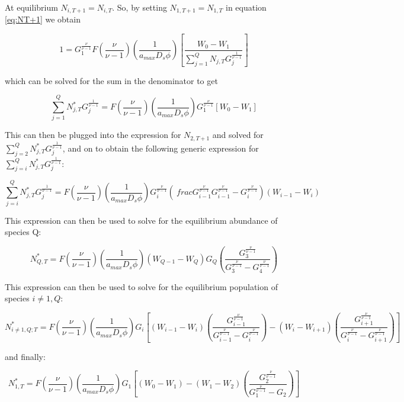 \documentclass{article}
\begin{document}
  At equilibrium $N_{i, T+1} = N_{i, T}$. So, by setting $N_{1, T+1} = N_{1, T}$
  in equation \ref{eq:NT+1} we obtain

  $$ 1 = G_{1}^{\frac{\nu}{\nu-1}}F(\frac{\nu}{\nu - 1})(\frac{1}{a_{max}D_{s}\phi})\left[ \frac{W_{0} - W_{1}}{\sum_{j = 1}^{Q}N_{j,T}G_{j}^{\frac{1}{\nu-1}}} \right] $$


  which can be solved for the sum in the denominator to get

  $$ \sum_{j = 1}^{Q}N_{j,T}^{*}G_{j}^{\frac{1}{\nu-1}} = F(\frac{\nu}{\nu - 1})(\frac{1}{a_{max}D_{s}\phi})G_{1}^{\frac{\nu}{\nu - 1}}[W_{0} - W_{1}]$$

  This can then be plugged into the expression for $N_{2, T+1}$ and
  solved for $\sum_{j = 2}^{Q}N_{j,T}^{*}G_{j}^{\frac{1}{\nu-1}}$, and on to
  obtain the following generic expression for
  $\sum_{j = i}^{Q}N_{j, T}^{*}G_{j}^{\frac{1}{\nu - 1}}$:

  \begin{equation} \label{eq:equil_sum}
    \sum_{j = i}^{Q}N_{j, T}^{*}G_{j}^{\frac{1}{\nu - 1}} = F(\frac{\nu}{\nu - 1})(\frac{1}{a_{max}D_{s}\phi})G_{i}^{\frac{\nu}{\nu - 1}}\left(\ frac{G_{i-1}^{\frac{\nu}{\nu-1}}}{G_{i-1}^{\frac{\nu}{\nu-1}} - G_{i}^{\frac{\nu}{\nu-1}}} \right)(W_{i-1} - W_{i})
  \end{equation}

  This expression can then be used to solve for the equilibrium abundance of
  species Q:

  \begin{equation} \label{eq:NstarQ}
   N_{Q, T}^{*} = F(\frac{\nu}{\nu - 1})(\frac{1}{a_{max}D_{s}\phi})(W_{Q-1} - W_{Q})G_{Q}(\frac{G_{3}^{\frac{\nu}{\nu-1}}}{G_{3}^{\frac{\nu}{\nu-1}} - G_{4}^{\frac{\nu}{\nu-1}}})
 \end{equation}

  This expression can then be used to solve for the equilibrium population of
  species $i \neq 1, Q$:

  \begin{equation} \label{eq:Nstari}
    N_{i \neq 1,Q; T}^{*} = F(\frac{\nu}{\nu - 1})(\frac{1}{a_{max}D_{s}\phi})G_{i}\left[ (W_{i-1} - W_{i})(\frac{G_{i-1}^{\frac{\nu}{\nu-1}}}{G_{i-1}^{\frac{\nu}{\nu-1}} - G_{i}^{\frac{\nu}{\nu-1}}}) - (W_{i} - W_{i+1})(\frac{G_{i+1}^{\frac{\nu}{\nu-1}}}{G_{i}^{\frac{\nu}{\nu-1}} - G_{i+1}^{\frac{\nu}{\nu-1}}}) \right]
  \end{equation}

  and finally:

  \begin{equation} \label{eq:Nstar1}
    N_{1, T}^{*} = F(\frac{\nu}{\nu - 1})(\frac{1}{a_{max}D_{s}\phi})G_{1}\left[ (W_{0} - W_{1}) - (W_{1} - W_{2})(\frac{G_{2}^{\frac{\nu}{\nu-1}}}{G_{1}^{\frac{\nu}{\nu-1}} - G_{2}}) \right]
  \end{equation}
\end{document}
